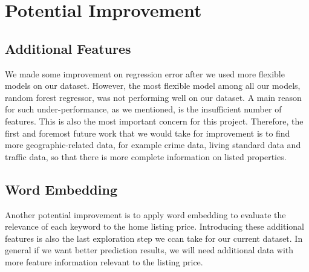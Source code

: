 \documentclass[twocolumn]{article}
\begin{document}
\section{Potential Improvement}
\subsection{Additional Features}
We made some improvement on regression error after we used more flexible models on our dataset. However, the most flexible model among all our models, random forest regressor, was not performing well on our dataset. A main reason for such under-performance, as we mentioned, is the insufficient number of features. This is also the most important  concern for this project. Therefore, the first and foremost future work that we would take for improvement is to find more geographic-related data, for example crime data, living standard data and traffic data, so that there is more complete information on listed properties. 

\subsection{Word Embedding}
Another potential improvement is to apply word embedding to evaluate the relevance of each keyword to the home listing price. Introducing these additional features is also the last exploration step we ccan take for our current dataset. In general if we want better prediction results, we will need additional data with more feature information relevant to the listing price.
\end{document}
